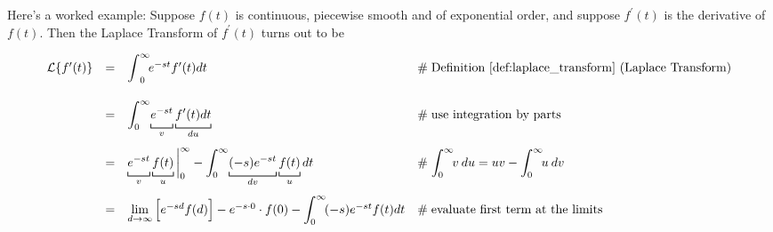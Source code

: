 \documentclass{article}
\theoremstyle{definition}
\begin{document}
\newpage

\noindent
Here's a worked example: Suppose $f(t)$ is continuous, piecewise smooth and of exponential order, and suppose $f^\prime(t)$ is the derivative of $f(t)$. Then the
Laplace Transform of $f^\prime(t)$ turns out to be

\begin{equation*}
\begin{array}{lllll}
\mathcal{L}\{f^\prime(t)\}
&=& \mathlarger{\int} ^\infty_0 \! e^{-st}  f^\prime(t) dt                                                                                                                      &\mathrel{\#} \text{Definition \ref{def:laplace_transform} (Laplace Transform)}       \\  
[20pt]                                                                                                                                                                                                 %
&=& \mathlarger{\int}^\infty_0 \! \underbracket [0.15 ex] {\strut e^{-st}}_{v}  \underbracket [0.15 ex] {\strut f^\prime(t) dt}_{du}      &\mathrel{\#} \text{use integration by parts}                                                             \\  
[20pt]                                                                                                                                                                                                 %
&=& \underbracket [0.15 ex] {\strut e^{-st}}_{v}  \underbracket [0.15 ex] {\strut f(t)}_{u} \bigg |^\infty_0   -   
        \mathlarger{\int}^\infty_0 \! \underbracket [0.15 ex] {\strut (-s) e^{-st}}_{dv}  \underbracket [0.15 ex] {\strut f(t)}_{u} dt 
        &\mathrel{\#} \mathlarger{\int}_0^\infty \! v \: du = uv - \mathlarger{\int}_0^\infty \! u \: dv                                                                                                                                                                                          \\  
[20pt]                                                                                                                                                                                                 %
&=& \lim\limits_{d \to \infty}\Big [e^{-sd} f(d) \Big ] - e^{-s \cdot 0} \cdot f(0) - \mathlarger{\int}^\infty_0 \!  (-s) e^{-st}  f(t) dt           &\mathrel{\#} \text{evaluate first term at the limits}                                                   \\
[20pt]                                                                                                                                                                                                %

\end{array}
\end{equation*}
\end{document}
